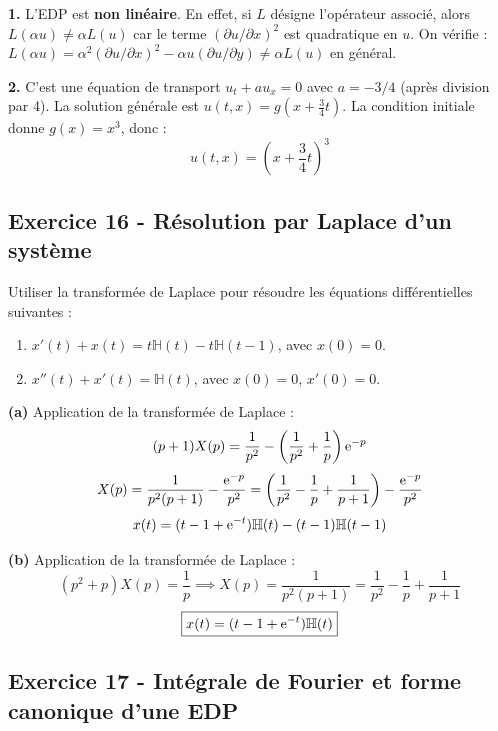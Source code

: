 \documentclass[12pt,a4paper]{article}
\begin{document}
\begin{boitecorrige}
\textbf{1.} L'EDP est \textbf{non linéaire}. En effet, si $L$ désigne l'opérateur associé, alors $L(\alpha u) \neq \alpha L(u)$ car le terme $(\partial u/\partial x)^2$ est quadratique en $u$. On vérifie : $L(\alpha u) = \alpha^2(\partial u/\partial x)^2 - \alpha u(\partial u/\partial y) \neq \alpha L(u)$ en général.

\textbf{2.} C'est une équation de transport $u_t + au_x = 0$ avec $a = -3/4$ (après division par 4). La solution générale est $u(t,x) = g(x + \frac{3}{4}t)$. La condition initiale donne $g(x) = x^3$, donc :
\[
\boxed{u(t,x) = \left(x + \frac{3}{4}t\right)^3}
\]
\end{boitecorrige}

\subsection*{Exercice 16 - Résolution par Laplace d'un système \niveau{\difficile}}

\begin{boiteexercice}
Utiliser la transformée de Laplace pour résoudre les équations différentielles suivantes :
\begin{enumerate}[label=(\alph*)]
  \item $x'(t) + x(t) = t\mathbb{H}(t) - t\mathbb{H}(t-1)$, avec $x(0) = 0$.
  \item $x''(t) + x'(t) = \mathbb{H}(t)$, avec $x(0) = 0$, $x'(0) = 0$.
\end{enumerate}
\end{boiteexercice}

\begin{boitecorrige}
\textbf{(a)} Application de la transformée de Laplace :
\[
(p+1)X(p) = \frac{1}{p^2} - \left(\frac{1}{p^2}+\frac{1}{p}\right)\mathrm{e}^{-p}
\]
\[
X(p) = \frac{1}{p^2(p+1)} - \frac{\mathrm{e}^{-p}}{p^2} = \left(\frac{1}{p^2} - \frac{1}{p} + \frac{1}{p+1}\right) - \frac{\mathrm{e}^{-p}}{p^2}
\]
\[
x(t) = (t-1+\mathrm{e}^{-t})\mathbb{H}(t) - (t-1)\mathbb{H}(t-1)
\]

\textbf{(b)} Application de la transformée de Laplace :
\[
(p^2+p)X(p) = \frac{1}{p} \implies X(p) = \frac{1}{p^2(p+1)} = \frac{1}{p^2} - \frac{1}{p} + \frac{1}{p+1}
\]
\[
\boxed{x(t) = (t-1+\mathrm{e}^{-t})\mathbb{H}(t)}
\]
\end{boitecorrige}

\subsection*{Exercice 17 - Intégrale de Fourier et forme canonique d'une EDP \niveau{\difficile}}
\end{document}
